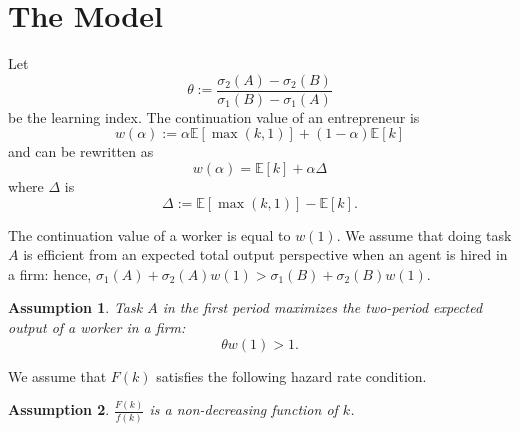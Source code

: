\documentclass[12pt]{article}
\newtheorem{assumption}{Assumption}
\newcommand{\E}[1]{\mathbb E[#1]}
\begin{document}
 
\title{} 
\author{Patrick Legros} 
\date{\today} 
\maketitle

\section{The Model}
Let 
%
\begin{equation}\label{learning}
    \theta :=\frac{\sigma_2(A)-\sigma_2(B)}{\sigma_1(B)-\sigma_1(A)}   
\end{equation}
%
be the learning index.  The continuation value of an entrepreneur is 
%
\begin{equation*}
    w(\alpha):= \alpha \E{\max(k,1)} +(1-\alpha)\E {k}   
\end{equation*}
%
and can be rewritten as 
%
\begin{equation}\label{continuation_value}
w(\alpha)=\E k +\alpha \Delta 
\end{equation}
%
where $\Delta$ is 
\begin{equation}\label{option-value}
    \Delta:=\E{\max(k,1)} -\E {k}.
\end{equation}

The continuation value of a worker is equal to $w(1)$.
%
We assume that doing task $A$ is efficient from an expected total output perspective when an agent is hired in a firm: hence, $\sigma_1(A)+\sigma_2(A)w(1)> \sigma_1(B)+\sigma_2(B)w(1)$.

\begin{assumption}\label{A-efficient}
    Task $A$ in the first period maximizes the two-period expected output of a worker in a firm:
    \[
  \theta  w(1)>1.  
    \]
\end{assumption}
%
We assume that $F(k)$ satisfies the following hazard rate condition.
\begin{assumption}\label{ass:hazard-rate}
    $\frac{F(k)}{f(k)}$ is a non-decreasing function of $k$.
\end{assumption}

%
\end{document}
